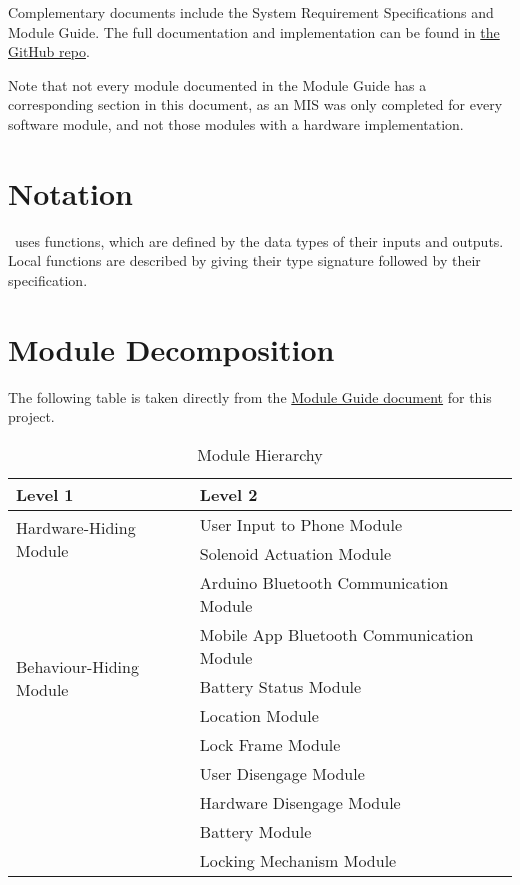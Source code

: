 \documentclass[12pt, titlepage]{article}
\begin{document}
Complementary documents include the System Requirement Specifications
and Module Guide.  The full documentation and implementation can be
found in \href{https://github.com/NevoAbigail/Capstone}{the GitHub repo}. %

Note that not every module documented in the Module Guide has a corresponding section in this document, as an MIS was only completed for every software module, and not those modules with a hardware implementation. 

\section{Notation}

\progname \ uses functions, which
are defined by the data types of their inputs and outputs. Local functions are
described by giving their type signature followed by their specification.

\section{Module Decomposition}

The following table is taken directly from the \href{https://github.com/NevoAbigail/Capstone/blob/main/docs/Design/SoftArchitecture/MG.pdf}{Module Guide document} for this project.

\begin{table}[h!]
\centering
\begin{tabular}{p{} p{}}
\toprule
\textbf{Level 1} & \textbf{Level 2}\\
\midrule

\multirow{2}{0.3\textwidth}{Hardware-Hiding Module} & User Input to Phone Module \\
& Solenoid Actuation Module \\
\midrule

\multirow{6}{0.3\textwidth}{Behaviour-Hiding Module} %
& Arduino Bluetooth Communication Module\\
& Mobile App Bluetooth Communication Module\\
& Battery Status Module \\
& Location Module  \\
& Lock Frame Module \\
\midrule

\multirow{5}{0.3\textwidth}{Software Decision Module} & User Disengage Module \\
& Hardware Disengage Module \\
& Battery Module \\
& Locking Mechanism Module \\
\bottomrule

\end{tabular}
\caption{Module Hierarchy}
\label{TblMH}
\end{table}
\end{document}
